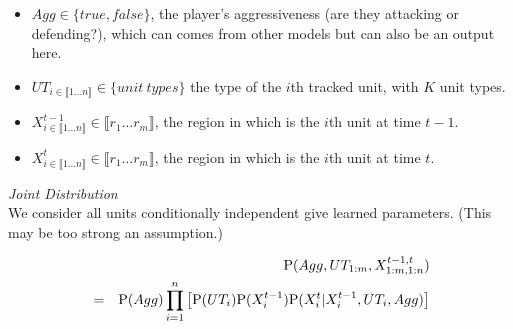 \begin{itemize}
    \item $Agg \in \{true,false\}$, the player's aggressiveness (are they attacking or defending?), which can comes from other models but can also be an output here. 
    \item $UT_{i \in \llbracket 1\dots n \rrbracket} \in \{unit\ types\}$ the type of the $i$th tracked unit, with $K$ unit types.
    \item $X^{t-1}_{i \in \llbracket 1\dots n \rrbracket} \in \llbracket r_1 \dots r_m \rrbracket$, the region in which is the $i$th unit at time $t-1$.
    \item $X^{t}_{i \in \llbracket 1\dots n \rrbracket} \in \llbracket r_1 \dots r_m \rrbracket$, the region in which is the $i$th unit at time $t$.
\end{itemize}


\vspace{0.3cm}
\textit{Joint Distribution}\\
We consider all units conditionally independent give learned parameters. (This may be too strong an assumption.) %

\begin{eqnarray}
& & \mathrm{P}(Agg, UT_{1:m}, X^{t-1,t}_{1:m,1:n}) \\
& = & \mathrm{P}(Agg)\prod_{i=1}^{n} \left[ \mathrm{P}(UT_{i}) \mathrm{P}(X^{t-1}_{i}) \mathrm{P}(X^t_{i}|X^{t-1}_{i},UT_i,Agg)\right]
\end{eqnarray}

